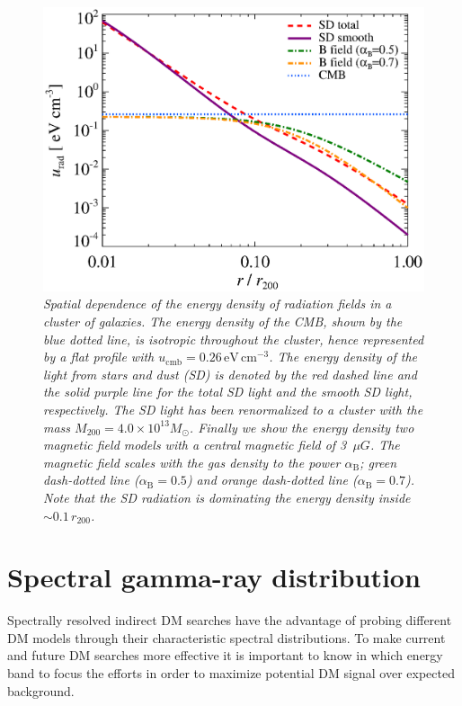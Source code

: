\documentclass[10pt,aps,pra,reprint,amsmath,amsfonts,amssymb,showpacs]{revtex4-1}
\newcommand{\rmn}{\mathrm}
\newcommand{\msun}{M_\odot}
\newcommand{\rvir}{r_{200}}
\newcommand{\mvir}{M_{200}}
\begin{document}
\begin{figure}%
 \includegraphics[width=0.99\columnwidth]{figures/ucool.eps}
 \caption{\it Spatial dependence of the energy density of radiation
   fields in a cluster of galaxies. The energy density of the CMB,
   shown by the blue dotted line, is isotropic throughout the cluster,
   hence represented by a flat profile with
   $u_\rmn{cmb}=0.26\,\rmn{eV}\,\rmn{cm}^{-3}$. The energy density of
   the light from stars and dust (SD) is denoted by the red dashed
   line and the solid purple line for the total SD light and the
   smooth SD light, respectively. The SD light has been renormalized
   to a cluster with the mass $\mvir=4.0\times10^{13}\msun$. Finally we
   show the energy density two magnetic field models with a central
   magnetic field of 3~$\mu G$. The magnetic field scales with the gas
   density to the power $\alpha_\rmn{B}$; green dash-dotted line
   ($\alpha_\rmn{B}=0.5$) and orange dash-dotted line
   ($\alpha_\rmn{B}=0.7$). Note that the SD radiation is dominating
   the energy density inside $\sim0.1\,\rvir$.}
 \label{fig:SD_Edens}
\end{figure}

\section{Spectral gamma-ray distribution}
\label{sect:spectral}
Spectrally resolved indirect DM searches have the advantage of probing
different DM models through their characteristic spectral
distributions. To make current and future DM searches more effective
it is important to know in which energy band to focus the efforts in
order to maximize potential DM signal over expected background.
\end{document}
